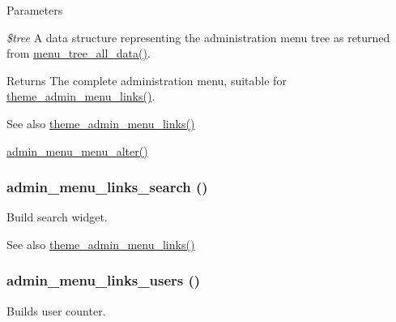 \begin{DoxyParams}{Parameters}
\item[{\em \$tree}]A data structure representing the administration menu tree as returned from \hyperlink{group__menu_ga4f06528e6ed613b6a885e051035b322a}{menu\_\-tree\_\-all\_\-data()}.\end{DoxyParams}
\begin{DoxyReturn}{Returns}
The complete administration menu, suitable for \hyperlink{admin__menu_8module_a33d1120bbd0ebf32f21f44c17b831475}{theme\_\-admin\_\-menu\_\-links()}.
\end{DoxyReturn}
\begin{DoxySeeAlso}{See also}
\hyperlink{admin__menu_8module_a33d1120bbd0ebf32f21f44c17b831475}{theme\_\-admin\_\-menu\_\-links()} 

\hyperlink{admin__menu_8module_a5215739b9f88a38d14ba99f5413b904e}{admin\_\-menu\_\-menu\_\-alter()} 
\end{DoxySeeAlso}
\hypertarget{admin__menu_8inc_a9c16c388d608eb3e3f7106e61080203d}{
\subsubsection[{admin\_\-menu\_\-links\_\-search}]{\setlength{\rightskip}{0pt plus 5cm}admin\_\-menu\_\-links\_\-search ()}}
\label{admin__menu_8inc_a9c16c388d608eb3e3f7106e61080203d}
Build search widget.

\begin{DoxySeeAlso}{See also}
\hyperlink{admin__menu_8module_a33d1120bbd0ebf32f21f44c17b831475}{theme\_\-admin\_\-menu\_\-links()} 
\end{DoxySeeAlso}
\hypertarget{admin__menu_8inc_aa054287a0a1394edc680d591f3ee1ae4}{
\subsubsection[{admin\_\-menu\_\-links\_\-users}]{\setlength{\rightskip}{0pt plus 5cm}admin\_\-menu\_\-links\_\-users ()}}
\label{admin__menu_8inc_aa054287a0a1394edc680d591f3ee1ae4}
Builds user counter.

